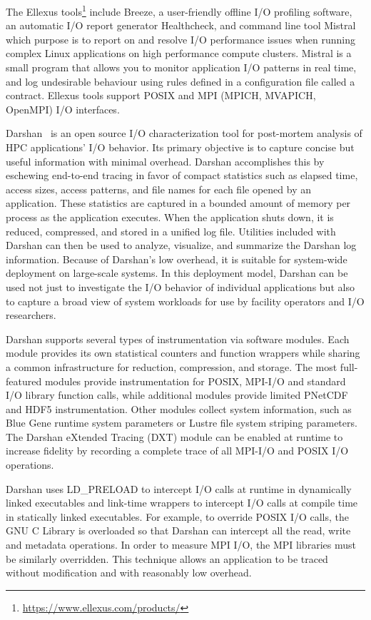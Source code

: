 \documentclass[]{llncs}
\begin{document}
The Ellexus tools\footnote{\url{https://www.ellexus.com/products/}} include Breeze, a user-friendly offline I/O profiling software, an automatic I/O report generator Healthcheck, and command line tool Mistral which purpose is to report on and resolve I/O performance issues when running complex Linux applications on high performance compute clusters.
Mistral is a small program that allows you to monitor application I/O patterns in real time, and log undesirable behaviour using rules defined in a configuration file called a contract.
Ellexus tools support POSIX and MPI (MPICH, MVAPICH, OpenMPI) I/O interfaces.

Darshan~\cite{carns2011understanding-toc,hpcdarshan} is an open source I/O characterization tool for post-mortem analysis of HPC applications' I/O behavior.
Its primary objective is to capture concise but useful information with minimal overhead.
Darshan accomplishes this by eschewing end-to-end tracing in favor of compact statistics such as elapsed time, access sizes, access patterns, and file names for each file opened by an application.
These statistics are captured in a bounded amount of memory per process as the application executes.
When the application shuts down, it is reduced, compressed, and stored in a unified log file.
Utilities included with Darshan can then be used to analyze, visualize, and summarize the Darshan log information.
Because of Darshan's low overhead, it is suitable for system-wide deployment on large-scale systems.
In this deployment model, Darshan can be used not just to investigate the I/O behavior of individual applications but also to capture a broad view of system workloads for use by facility operators and I/O researchers.

Darshan supports several types of instrumentation via software modules.
Each module provides its own statistical counters and function wrappers while sharing a common infrastructure for reduction, compression, and storage.
The most full-featured modules provide instrumentation for POSIX, MPI-I/O and standard I/O library function calls, while additional modules provide limited PNetCDF and HDF5 instrumentation.
Other modules collect system information, such as Blue Gene runtime system parameters or Lustre file system striping parameters.
The Darshan eXtended Tracing (DXT) module can be enabled at runtime to increase fidelity by recording a complete trace of all MPI-I/O and POSIX I/O operations.

Darshan uses LD\_PRELOAD to intercept I/O calls at runtime in dynamically linked executables and link-time wrappers to intercept I/O calls at compile time in statically linked executables.
For example, to override POSIX I/O calls, the GNU C Library is overloaded so that Darshan can intercept all the read, write and metadata operations.
In order to measure MPI I/O, the MPI libraries must be similarly overridden.
This technique allows an application to be traced without modification and with reasonably low overhead.
\end{document}
